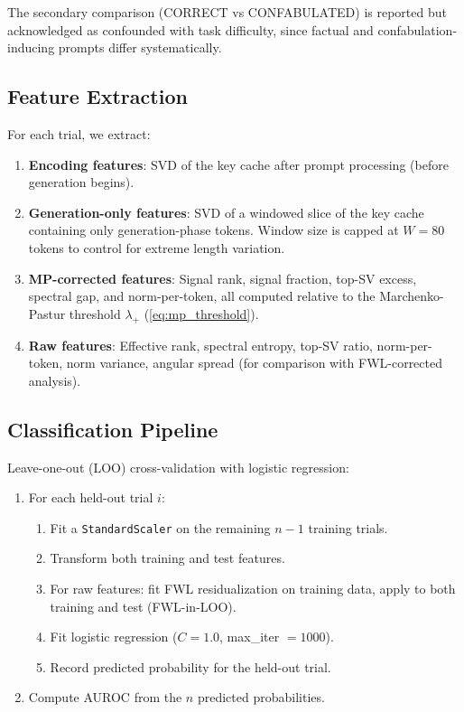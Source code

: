 The secondary comparison (CORRECT vs CONFABULATED) is reported but
acknowledged as confounded with task difficulty, since factual and
confabulation-inducing prompts differ systematically.

\subsection{Feature Extraction}

For each trial, we extract:

\begin{enumerate}[nosep]
  \item \textbf{Encoding features}: SVD of the key cache after prompt
    processing (before generation begins).
  \item \textbf{Generation-only features}: SVD of a windowed slice of
    the key cache containing only generation-phase tokens. Window size
    is capped at $W = 80$ tokens to control for extreme length
    variation.
  \item \textbf{MP-corrected features}: Signal rank, signal fraction,
    top-SV excess, spectral gap, and norm-per-token, all computed
    relative to the Marchenko-Pastur threshold $\lambda_+$
    (\cref{eq:mp_threshold}).
  \item \textbf{Raw features}: Effective rank, spectral entropy,
    top-SV ratio, norm-per-token, norm variance, angular spread
    (for comparison with FWL-corrected analysis).
\end{enumerate}

\subsection{Classification Pipeline}

Leave-one-out (LOO) cross-validation with logistic regression:

\begin{enumerate}[nosep]
  \item For each held-out trial $i$:
    \begin{enumerate}[nosep]
      \item Fit a \texttt{StandardScaler} on the remaining $n-1$
        training trials.
      \item Transform both training and test features.
      \item For raw features: fit FWL residualization on training data,
        apply to both training and test (FWL-in-LOO).
      \item Fit logistic regression ($C = 1.0$, max\_iter $= 1000$).
      \item Record predicted probability for the held-out trial.
    \end{enumerate}
  \item Compute AUROC from the $n$ predicted probabilities.
\end{enumerate}

